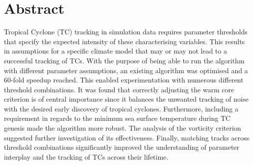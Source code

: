 
 \setcounter{tocdepth}{2}
 \tableofcontents



\chapter*{Abstract}
Tropical Cyclone (TC) tracking in simulation data requires parameter thresholds that specify the expected intensity of these characterising variables. This results in assumptions for a specific climate model that may or may not lead to a successful tracking of TCs. With the purpose of being able to run the algorithm with different parameter assumptions, an existing algorithm was optimised and a 60-fold speedup reached. This enabled experimentation with numerous different threshold combinations. It was found that correctly adjusting the warm core criterion is of central importance since it balances the unwanted tracking of noise with the desired early discovery of tropical cyclones. Furthermore, including a requirement in regards to the minimum sea surface temperature during TC genesis made the algorithm more robust. The analysis of the vorticity criterion suggested further investigation of its effectiveness. Finally, matching tracks across threshold combinations significantly improved the understanding of parameter interplay and the tracking of TCs across their lifetime.